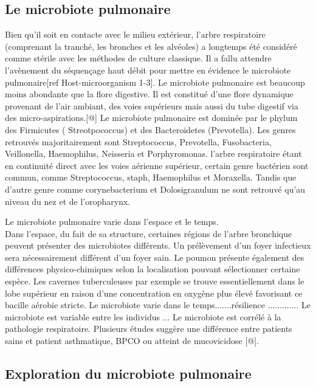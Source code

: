 \documentclass[12pt,a4paper]{article}
\begin{document}
\subsection{Le microbiote pulmonaire}

Bien qu'il soit en contacte avec le milieu extérieur, l’arbre respiratoire (comprenant la tranché, les bronches et les alvéoles) a longtemps été considéré comme stérile avec les méthodes de culture classique. Il a fallu attendre l’avènement du séquençage haut débit pour mettre en évidence le microbiote pulmonaire[ref Host-microorganism 1-3].
Le microbiote pulmonaire est beaucoup moins abondante que la flore digestive. Il est constitué d’une flore dynamique provenant de l’air ambiant, des voies supérieurs  mais aussi du tube digestif via des micro-aspirations.[@]
Le microbiote pulmonaire est dominée par le phylum des Firmicutes ( Streotpococcus) et des Bacteroidetes (Prevotella). Les genres retrouvés majoritairement sont Streptococcus, Prevotella, Fusobacteria, Veillonella, Haemophilus, Neisseria et Porphyromonas.
l’arbre respiratoire étant en continuité direct avec les voies aérienne supérieur, certain genre bactérien sont commun, comme Streptococcus, staph, Haemophilus et Moraxella. Tandis que d’autre genre comme corynebacterium et Dolosigranulum ne sont retrouvé qu’au niveau du nez et de l'oropharynx.

Le microbiote pulmonaire varie dans l’espace et le temps. \\
Dans l’espace, du fait de sa structure, certaines régions de l'arbre bronchique peuvent présenter des microbiotes différents. Un prélèvement d'un foyer infectieux sera nécessairement différent d'un foyer sain. Le poumon présente également des différences physico-chimiques selon la localisation pouvant sélectionner certaine espèce. Les cavernes tuberculeuses par exemple se trouve essentiellement dans le lobe supérieur en raison d'une concentration en oxygène plus élevé favorisant ce bacille aérobie stricte. 
Le microbiote varie dans le temps.......résilience .............
Le microbiote est variable entre les individus ... 
Le microbiote est corrélé à la pathologie respiratoire. Plusieurs études suggère une différence entre patients sains et patient asthmatique, BPCO ou atteint de mucovicidose [@].

\subsection{Exploration du microbiote pulmonaire}
\end{document}

